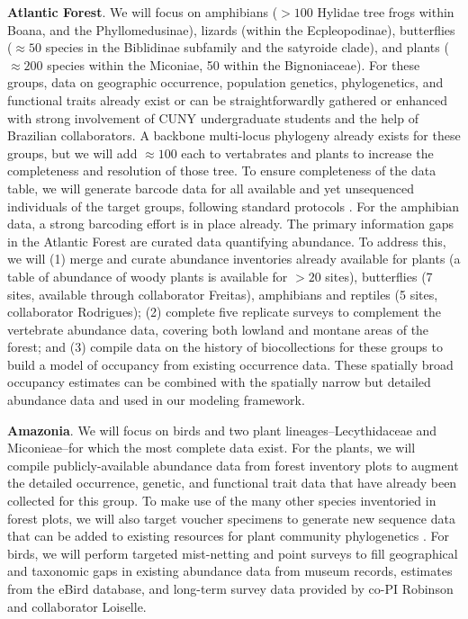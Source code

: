 \documentclass[11pt]{article}
\begin{document}
\textbf{Atlantic Forest}. We will focus on amphibians ($> 100$ Hylidae
tree frogs within Boana, and the Phyllomedusinae), lizards (within the
Ecpleopodinae), butterflies ($\approx 50$ species in the Biblidinae
subfamily and the satyroide clade), and plants ($\approx 200$ species
within the Miconiae, 50 within the Bignoniaceae). For these groups,
data on geographic occurrence, population genetics, phylogenetics, and
functional traits already exist or can be straightforwardly gathered
or enhanced with strong involvement of CUNY undergraduate students and
the help of Brazilian collaborators. A backbone multi-locus phylogeny
already exists for these groups, but we will add $\approx 100$ each to
vertabrates and plants to increase the completeness and resolution of
those tree. To ensure completeness of the data table, we will generate
barcode data for all available and yet unsequenced individuals of the
target groups, following standard protocols \cite{che2012,
  Krehenwinkel2017-zk, bi2018chloroplast}. For the amphibian data, a
strong barcoding effort is in place already.  The primary information
gaps in the Atlantic Forest are curated data quantifying abundance. To
address this, we will (1) merge and curate abundance inventories
already available for plants (a table of abundance of woody plants is
available for $> 20$ sites), butterflies (7 sites, available through
collaborator Freitas), amphibians and reptiles (5 sites, collaborator
Rodrigues); (2) complete five replicate surveys to complement the
vertebrate abundance data, covering both lowland and montane areas of
the forest; and (3) compile data on the history of biocollections for
these groups to build a model of occupancy from existing occurrence
data. These spatially broad occupancy estimates can be combined with
the spatially narrow but detailed abundance data and used in our
modeling framework.

\textbf{Amazonia}. We will focus on birds and two plant
lineages--Lecythidaceae and Miconieae--for which the most complete
data exist. For the plants, we will compile publicly-available
abundance data from forest inventory plots
\cite{Lopez-Gonzalez2011-wr, Ter_Steege2011-yr, Rainfor2018-so} to
augment the detailed occurrence, genetic, and functional trait data
that have already been collected for this group. To make use of the
many other species inventoried in forest plots, we will also target
voucher specimens to generate new sequence data that can be added to
existing resources for plant community phylogenetics
\cite{webb2008phylocom, Harmon2013-wb}.  For birds, we will perform
targeted mist-netting and point surveys to fill geographical and
taxonomic gaps in existing abundance data from museum records,
estimates from the eBird database, and long-term survey data provided
by co-PI Robinson and collaborator Loiselle.
\end{document}

